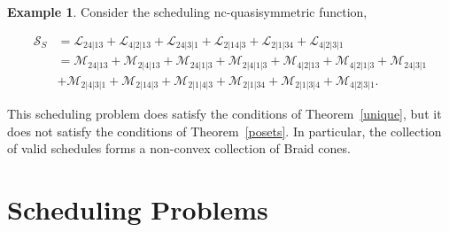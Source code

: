 \documentclass[12pt,reqno]{amsart}
\numberwithin{definition}{section}
\theoremstyle{definition}
\newtheorem{example}[definition]{Example}
\newcommand{\SSS}{\mathcal{S}}
\newcommand{\ncM}{\mathcal{M}}
\newcommand{\ncL}{\mathcal{L}}
\begin{document}
\begin{example} 
Consider the scheduling nc-quasisymmetric function,

\begin{align*}
\SSS_S & = \ncL_{24|13} + \ncL_{4|2|13} + \ncL_{24|3|1} + \ncL_{2|14|3} + \ncL_{2|1|34} + \ncL_{4|2|3|1}\\
& = \ncM_{24|13} + \ncM_{2|4|13} + \ncM_{24|1|3} + \ncM_{2|4|1|3} + \ncM_{4|2|13} + \ncM_{4|2|1|3} + \ncM_{24|3|1}\\
& + \ncM_{2|4|3|1} + \ncM_{2|14|3} + \ncM_{2|1|4|3} + \ncM_{2|1|34} + \ncM_{2|1|3|4} + \ncM_{4|2|3|1}.
\end{align*}

This scheduling problem does satisfy the conditions of Theorem~\ref{unique}, but it does not satisfy the conditions of Theorem~\ref{posets}.  In particular, the collection of valid schedules forms a non-convex collection of Braid cones.

\end{example}


%








\section{Scheduling Problems}
\label{sec:scheduling-problems}
\end{document}
